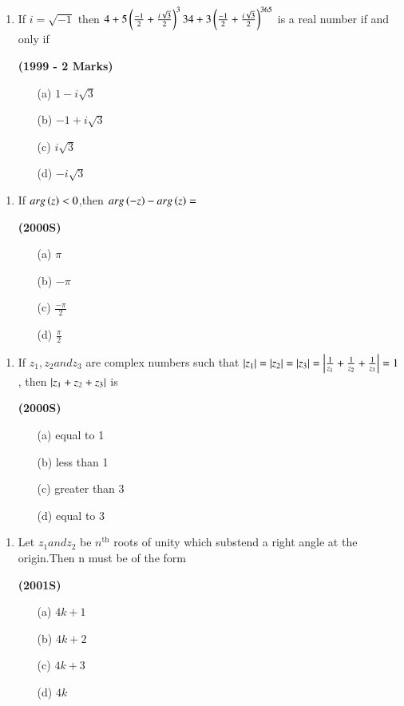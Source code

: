 \documentclass[journal,12pt,twocolumn]{IEEEtran}
\theoremstyle{remark}
\begin{document}
\begin{enumerate}[start=13]
\item If $i=\sqrt{-1}$ then $4+5\left(\frac{-1}{2}+\frac{i\sqrt{3}}{2}\right)^334 + 3\left(\frac{-1}{2}+\frac{i\sqrt{3}}{2}\right)^{365}$ is a real number if and only if 

\hfill{\textbf{(1999 - 2 Marks)}}

\begin{enumerate}
\item[(a)]$1-i\sqrt{3}$
\item[(b)]$-1+i\sqrt{3}$
\item[(c)]$i\sqrt{3}$
\item[(d)]$-i\sqrt{3}$
\end{enumerate}
\end{enumerate}
\begin{enumerate}[start=14]
\item If $arg\left(z\right)<0$,then $arg\left(-z\right)-arg\left(z\right)=$

\hfill{\textbf{(2000S)}}

\begin{enumerate}
\item[(a)]$\pi$
\item[(b)]$-\pi$
\item[(c)]$\frac{-\pi}{2}$
\item[(d)]$\frac{\pi}{2}$
\end{enumerate}
\end{enumerate}
\begin{enumerate}[start=15]
\item If $z_1,z_2 and z_3$ are complex numbers such that $\left\vert z_1\right\vert=\left\vert z_2\right\vert=\left\vert z_3\right\vert=\left\vert\frac{1}{z_1}+\frac{1}{z_2}+\frac{1}{z_3}\right\vert=1$, then $\left\vert z_1+z_2+z_3\right\vert$ is 

\hfill{\textbf{(2000S)}}

\begin{enumerate}
\item[(a)]equal to 1
\item[(b)]less than 1
\item[(c)]greater than 3
\item[(d)]equal to 3
\end{enumerate}
\end{enumerate}
\begin{enumerate}[start=16]
\item Let $z_1 and z_2$ be $n^{\text{th}}$ roots of unity which substend a right angle at the origin.Then n must be of the form

\hfill{\textbf{(2001S)}}

\begin{enumerate}
\item[(a)]$4k+1$
\item[(b)]$4k+2$
\item[(c)]$4k+3$
\item[(d)]$4k$
\end{enumerate}
\end{enumerate}
\end{document}
